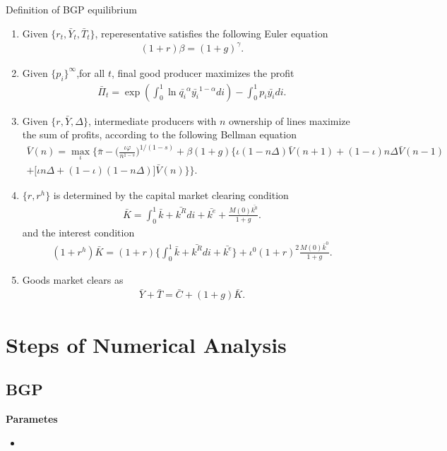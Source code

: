 \documentclass[a4paper,12pt]{article}
\begin{document}
Definition of BGP equilibrium
\begin{enumerate}
    \item Given $\{r_t, \bar{Y}_t, \bar{T}_t\}$, reperesentative satisfies the following Euler equation
    \begin{align}
        (1+r)\beta = (1+g)^\gamma.
    \end{align}
    \item Given $\{p_i\}^\infty$,for all $t$, final good producer maximizes the profit
    \begin{align}
        \bar{\Pi}_t = \exp (\int_0^1 \ln \bar{q_i}^\alpha \bar{y_i}^{1-\alpha} di) -\int_0^1 p_i \bar{y_i} di.
    \end{align}
    \item Given $\{r, \bar{Y}, \Delta\}$, intermediate producers with $n$ ownership of lines maximize the sum of profits, according to the following Bellman equation
    \begin{align}
        \bar{V}(n) = \max_{\iota}\bigg\{\bar{\pi} - \big(\frac{\iota\varphi}{n^{1-s}}\big)^{1/(1-s)} + \beta (1+g)\Big\{\iota (1-n\Delta)\bar{V}(n+1) + (1-\iota)n\Delta \bar{V}(n-1) \\ 
        + \big[\iota n\Delta+(1-\iota)(1-n\Delta)\big]\bar{V}(n) \Big\}
        \bigg\}.
    \end{align}
    \item $\{r, r^h\}$ is determined by the capital market clearing condition
    \begin{align}
        \bar{K} = \int_0^1 \bar{k} + \bar{k^R} di + \bar{k^e} + \frac{M(0)\bar{k^0}}{1+g}.
    \end{align}
    and the interest condition
    \begin{align}
        (1+r^h)\bar{K} = (1+r)\Big\{\int_0^1 \bar{k}+ \bar{k^R} di + \bar{k^e} \Big\} + \iota^0(1+r)^2 \frac{M(0)\bar{k}^0}{1+g}.
    \end{align}
    \item Goods market clears as
    \begin{align}
        \bar{Y} + \bar{T} = \bar{C} + (1+g)\bar{K}.
    \end{align}

\end{enumerate}
\clearpage
\section{Steps of Numerical Analysis}
\subsection{BGP}
\textbf{Parametes}
\begin{itemize}
    \item 
\end{itemize}
\end{document}
